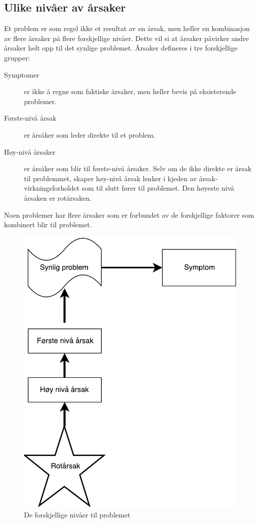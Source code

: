 \subsection{Ulike nivåer av årsaker}
Et problem er som regel ikke et resultat av en årsak, men heller en kombinasjon av flere årsaker på flere forskjellige nivåer. Dette vil si at årsaker påvirker andre årsaker helt opp til det synlige problemet. Årsaker defineres i tre forskjellige grupper: 

\begin{description}
    \item[Symptomer] er ikke å regne som faktiske årsaker, men heller bevis på eksisterende problemer.
    \item[Første-nivå årsak] er årsåker som leder direkte til et problem.
    \item[Høy-nivå årsaker] er årsåker som blir til første-nivå årsaker. Selv om de ikke direkte er årsak til problemmet, skaper høy-nivå årsak lenker i kjeden av årsak-virkningsforholdet som til slutt fører til problemet. Den høyeste nivå årsaken er rotårsaken.  
\end{description}
Noen problemer har flere årsaker som er forbundet av de forskjellige faktorer som kombinert blir til problemet.

\begin{figure}[H]
    \centering
    \includegraphics[scale=0.6]{main/bilder/nivaa.pdf}
    \caption[Nivåer av årsaker]{De forskjellige nivåer til problemet}
    \label{fig:nivaa}
\end{figure}

